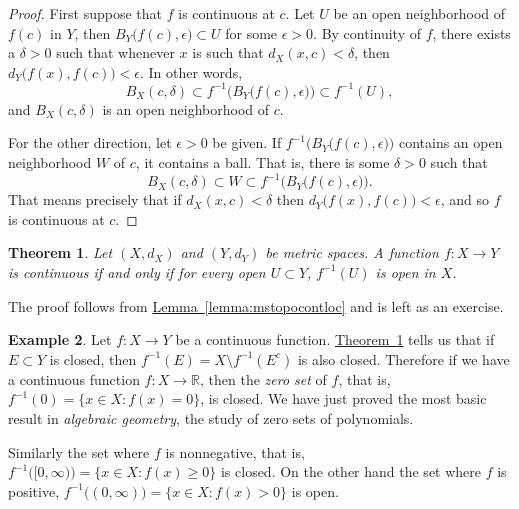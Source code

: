 \documentclass[12pt]{book}
\newcommand{\R}{{\mathbb{R}}}
\newcommand{\myindex}[1]{#1\index{#1}}
\theoremstyle{plain}
\newtheorem{thm}{Theorem}[section]
\theoremstyle{remark}
\theoremstyle{definition}
\theoremstyle{exercise}
\theoremstyle{example}
\newtheorem{example}[thm]{Example}
\newcommand{\thmref}[1]{\hyperref[#1]{Theorem~\ref*{#1}}}
\newcommand{\lemmaref}[1]{\hyperref[#1]{Lemma~\ref*{#1}}}
\begin{document}
\begin{proof}
First suppose that $f$ is continuous at $c$.
Let $U$ be an open neighborhood of $f(c)$
in $Y$, then $B_Y\bigl(f(c),\epsilon\bigr) \subset U$ for some $\epsilon >
0$.  By continuity of $f$, there exists a $\delta > 0$
such that whenever $x$ is such that $d_X(x,c) < \delta$, then
$d_Y\bigl(f(x),f(c)\bigr) < \epsilon$.  In other words,
\begin{equation*}
B_X(c,\delta) \subset f^{-1}\bigl(B_Y\bigl(f(c),\epsilon\bigr)\bigr) \subset
f^{-1}(U) ,
\end{equation*}
and $B_X(c,\delta)$ is an open neighborhood of $c$.

For the other direction,
let $\epsilon > 0$ be given.  If
$f^{-1}\bigl(B_Y\bigl(f(c),\epsilon\bigr)\bigr)$ contains an open
neighborhood $W$ of $c$, it contains a ball.  That is, there is some $\delta > 0$
such that
\begin{equation*}
B_X(c,\delta) \subset W \subset f^{-1}\bigl(B_Y\bigl(f(c),\epsilon\bigr)\bigr) .
\end{equation*}
That means precisely that if $d_X(x,c) < \delta$ then $d_Y\bigl(f(x),f(c)\bigr)
< \epsilon$, and so $f$ is continuous at $c$.
\end{proof}

\begin{thm} \label{thm:mstopocont}
Let $(X,d_X)$ and $(Y,d_Y)$ be metric spaces.  A function $f \colon X \to Y$
is continuous if and only if
for every open $U \subset Y$, $f^{-1}(U)$ is open in $X$.
\end{thm}

The proof follows from \lemmaref{lemma:mstopocontloc} and is left as
an exercise.

\begin{example}
Let $f \colon X \to Y$ be a continuous function.
\thmref{thm:mstopocont} tells us that if $E \subset Y$ is closed, then 
$f^{-1}(E) = X \setminus f^{-1}(E^c)$ is also closed.  Therefore if
we have a continuous
function $f \colon X \to \R$, then the
\emph{\myindex{zero set}} of $f$, that is, 
$f^{-1}(0) = \{ x \in X :
f(x) = 0 \}$, is closed.  We have just proved the most basic result in
\emph{\myindex{algebraic geometry}}, the study of
zero sets of polynomials.

Similarly the set where $f$ is nonnegative, that is,
$f^{-1}\bigl( [0,\infty) \bigr) = \{ x \in X :
f(x) \geq 0 \}$ is closed.  On the other hand the
set where $f$ is positive,
$f^{-1}\bigl( (0,\infty) \bigr) = \{ x \in X :
f(x) > 0 \}$ is open.  
\end{example}
\end{document}
